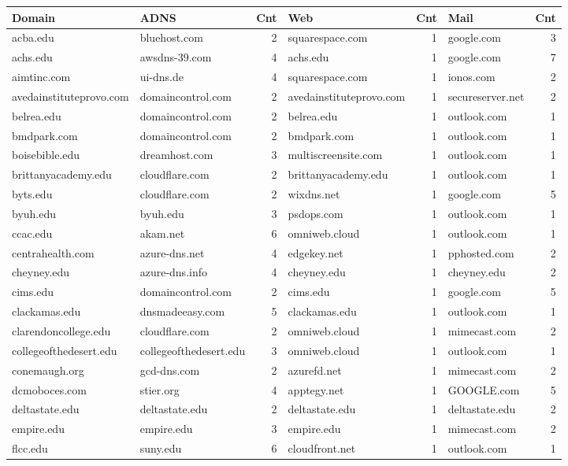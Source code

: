 \begin{tabular}{l l r l r l r}
\hline
Domain & ADNS & Cnt & Web & Cnt & Mail & Cnt \\
\hline
acba.edu & bluehost.com & 2 & squarespace.com & 1 & google.com & 3 \\
achs.edu & awsdns-39.com & 4 & achs.edu & 1 & google.com & 7 \\
aimtinc.com & ui-dns.de & 4 & squarespace.com & 1 & ionos.com & 2 \\
avedainstituteprovo.com & domaincontrol.com & 2 & avedainstituteprovo.com & 1 & secureserver.net & 2 \\
belrea.edu & domaincontrol.com & 2 & belrea.edu & 1 & outlook.com & 1 \\
bmdpark.com & domaincontrol.com & 2 & bmdpark.com & 1 & outlook.com & 1 \\
boisebible.edu & dreamhost.com & 3 & multiscreensite.com & 1 & outlook.com & 1 \\
brittanyacademy.edu & cloudflare.com & 2 & brittanyacademy.edu & 1 & outlook.com & 1 \\
byts.edu & cloudflare.com & 2 & wixdns.net & 1 & google.com & 5 \\
byuh.edu & byuh.edu & 3 & psdops.com & 1 & outlook.com & 1 \\
ccac.edu & akam.net & 6 & omniweb.cloud & 1 & outlook.com & 1 \\
centrahealth.com & azure-dns.net & 4 & edgekey.net & 1 & pphosted.com & 2 \\
cheyney.edu & azure-dns.info & 4 & cheyney.edu & 1 & cheyney.edu & 2 \\
cims.edu & domaincontrol.com & 2 & cims.edu & 1 & google.com & 5 \\
clackamas.edu & dnsmadeeasy.com & 5 & clackamas.edu & 1 & outlook.com & 1 \\
clarendoncollege.edu & cloudflare.com & 2 & omniweb.cloud & 1 & mimecast.com & 2 \\
collegeofthedesert.edu & collegeofthedesert.edu & 3 & omniweb.cloud & 1 & outlook.com & 1 \\
conemaugh.org & gcd-dns.com & 2 & azurefd.net & 1 & mimecast.com & 2 \\
dcmoboces.com & stier.org & 4 & apptegy.net & 1 & GOOGLE.com & 5 \\
deltastate.edu & deltastate.edu & 2 & deltastate.edu & 1 & deltastate.edu & 2 \\
empire.edu & empire.edu & 3 & empire.edu & 1 & mimecast.com & 2 \\
flcc.edu & suny.edu & 6 & cloudfront.net & 1 & outlook.com & 1 \\

\end{tabular}
